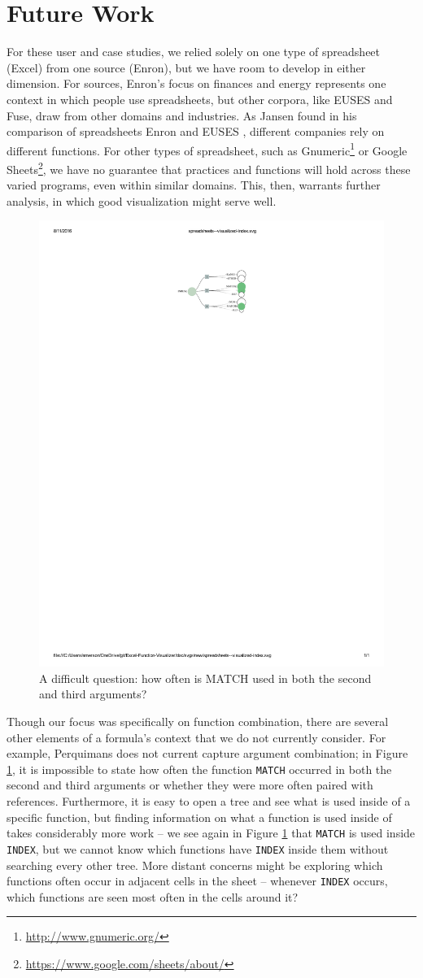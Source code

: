 \documentclass[conference]{IEEEtran}
\newcommand{\toolname}{Perquimans\xspace} \newcommand{\toolnameend}{Perquimans}
\begin{document}
	\section{Future Work}
	
	For these user and case studies, we relied solely on one type of spreadsheet (Excel)
	from one source (Enron), but we have room to develop in either dimension. For sources, 
	Enron's focus on finances and energy represents one context in
	which people use spreadsheets, but other corpora, like EUSES and Fuse, draw from
	other domains and industries. As Jansen found in his comparison of
	spreadsheets Enron and EUSES \cite{jansen2015enron}, different companies rely
	on different functions. For other types of spreadsheet, such as Gnumeric\footnote{\href{http://www.gnumeric.org/}{http://www.gnumeric.org/}} or Google
	Sheets\footnote{\href{https://www.google.com/sheets/about/}{https://www.google.com/sheets/about/}}, we have no
	guarantee that practices and functions will hold across these varied programs, even within
	similar domains. This, then, warrants further analysis, in which good visualization might serve
	well. 
	
	\begin{figure} \centering \includegraphics[width=.4\textwidth]{index}
		\caption{A difficult question: how often is MATCH used in both the second and
			third arguments?} \label{fig:index} \end{figure}
	
	Though our focus was specifically on function combination, there are several
	other elements of a formula's context that we do not currently consider. For
	example, \toolname does not current capture argument combination; in Figure
	\ref{fig:index}, it is impossible to state how often the function \texttt{MATCH}
	occurred in both the second and third arguments or whether they were more often
	paired with references. Furthermore, it is easy to open a tree and see what is
	used inside of a specific function, but finding information on what a function
	is used inside of takes considerably more work -- we see again in Figure
	\ref{fig:index} that \texttt{MATCH} is used inside \texttt{INDEX}, but we cannot know which
	functions have \texttt{INDEX} inside them without searching every other tree. More
	distant concerns might be exploring which functions often occur in adjacent
	cells in the sheet -- whenever \texttt{INDEX} occurs, which functions are seen most
	often in the cells around it?
	
\end{document}
